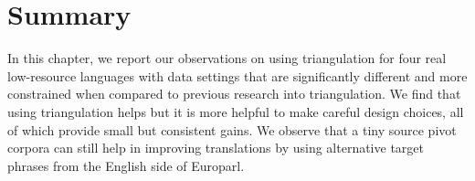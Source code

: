 \section{Summary}
\label{sec:remarks}
In this chapter, we report our observations on using triangulation for four real low-resource languages with data settings that are significantly different and more constrained when compared to previous research into triangulation. We find that using triangulation helps but it is more helpful to make careful design choices, all of which provide small but consistent gains. We observe that a tiny source pivot corpora can still help in improving translations by using alternative target phrases from the English side of Europarl. 
